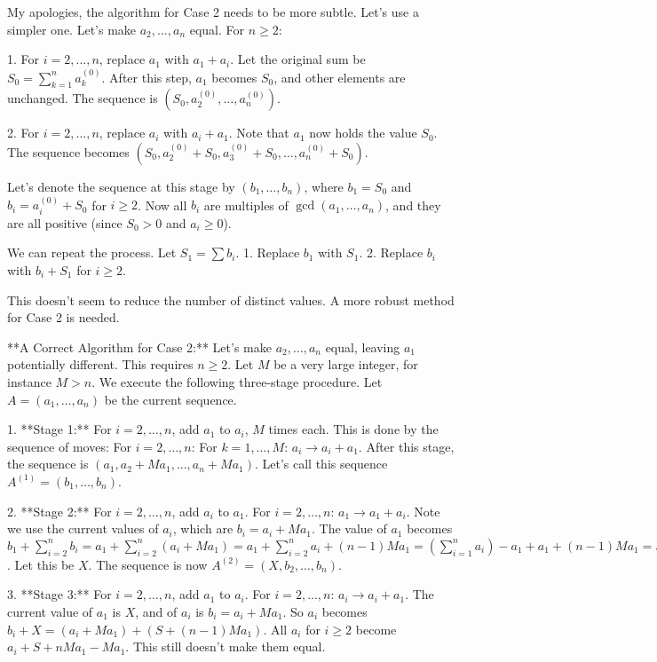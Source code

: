 My apologies, the algorithm for Case 2 needs to be more subtle. Let's use a simpler one.
Let's make $a_2, \ldots, a_n$ equal. For $n \ge 2$:

1.  For $i=2, \dots, n$, replace $a_1$ with $a_1+a_i$. Let the original sum be $S_0 = \sum_{k=1}^n a_k^{(0)}$. After this step, $a_1$ becomes $S_0$, and other elements are unchanged. The sequence is $(S_0, a_2^{(0)}, \dots, a_n^{(0)})$.

2.  For $i=2, \dots, n$, replace $a_i$ with $a_i+a_1$. Note that $a_1$ now holds the value $S_0$. The sequence becomes $(S_0, a_2^{(0)}+S_0, a_3^{(0)}+S_0, \dots, a_n^{(0)}+S_0)$.

Let's denote the sequence at this stage by $(b_1, \dots, b_n)$, where $b_1=S_0$ and $b_i = a_i^{(0)}+S_0$ for $i \ge 2$. Now all $b_i$ are multiples of $\gcd(a_1, \dots, a_n)$, and they are all positive (since $S_0 > 0$ and $a_i \ge 0$).

We can repeat the process. Let $S_1=\sum b_i$.
1. Replace $b_1$ with $S_1$.
2. Replace $b_i$ with $b_i+S_1$ for $i \ge 2$.

This doesn't seem to reduce the number of distinct values. A more robust method for Case 2 is needed.

**A Correct Algorithm for Case 2:**
Let's make $a_2, \ldots, a_n$ equal, leaving $a_1$ potentially different. This requires $n \ge 2$.
Let $M$ be a very large integer, for instance $M > n$.
We execute the following three-stage procedure. Let $A = (a_1, \ldots, a_n)$ be the current sequence.

1.  **Stage 1:** For $i=2, \dots, n$, add $a_1$ to $a_i$, $M$ times each.
    This is done by the sequence of moves:
    For $i=2, \dots, n$:
        For $k=1, \dots, M$:
            $a_i \to a_i + a_1$.
    After this stage, the sequence is $(a_1, a_2+Ma_1, \dots, a_n+Ma_1)$. Let's call this sequence $A^{(1)}=(b_1, \dots, b_n)$.

2.  **Stage 2:** For $i=2, \dots, n$, add $a_i$ to $a_1$.
    For $i=2, \dots, n$:
        $a_1 \to a_1+a_i$.
    Note we use the current values of $a_i$, which are $b_i=a_i+Ma_1$.
    The value of $a_1$ becomes $b_1 + \sum_{i=2}^n b_i = a_1 + \sum_{i=2}^n (a_i+Ma_1) = a_1 + \sum_{i=2}^n a_i + (n-1)Ma_1 = (\sum_{i=1}^n a_i) - a_1 + a_1 + (n-1)Ma_1 = S + (n-1)Ma_1$. Let this be $X$.
    The sequence is now $A^{(2)}=(X, b_2, \dots, b_n)$.

3.  **Stage 3:** For $i=2, \dots, n$, add $a_1$ to $a_i$.
    For $i=2, \dots, n$:
        $a_i \to a_i+a_1$.
    The current value of $a_1$ is $X$, and of $a_i$ is $b_i=a_i+Ma_1$.
    So $a_i$ becomes $b_i+X = (a_i+Ma_1) + (S+(n-1)Ma_1)$.
    All $a_i$ for $i \ge 2$ become $a_i+S+nMa_1-Ma_1$.
    This still doesn't make them equal.

